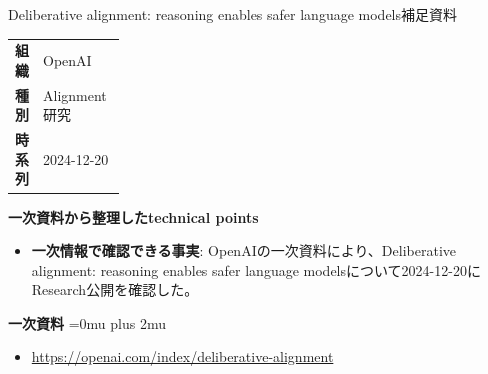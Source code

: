 \begin{technicalnote}{Deliberative alignment: reasoning enables safer language models}{補足資料}
\begingroup
\begin{tabularx}{\linewidth}{@{}>{\bfseries}p{0.22\linewidth}X@{}}
組織 & OpenAI \\
種別 & Alignment研究 \\
時系列 & 2024-12-20 \\
\end{tabularx}
\smallskip
{\bfseries 一次資料から整理したtechnical points}
\begin{itemize}[leftmargin=1.5em,itemsep=0.35em]
\item \textbf{一次情報で確認できる事実}: OpenAIの一次資料により、Deliberative alignment: reasoning enables safer language modelsについて2024-12-20にResearch公開を確認した。
\end{itemize}
\begin{minipage}{\linewidth}
\begin{samepage}
{\bfseries 一次資料}
\begingroup\sloppy
\Urlmuskip=0mu plus 2mu\relax
\begin{itemize}[leftmargin=1.5em,itemsep=0.25em]
\item {\scriptsize\url{https://openai.com/index/deliberative-alignment}}
\end{itemize}
\endgroup
\end{samepage}
\end{minipage}
\endgroup
\end{technicalnote}
\medskip

